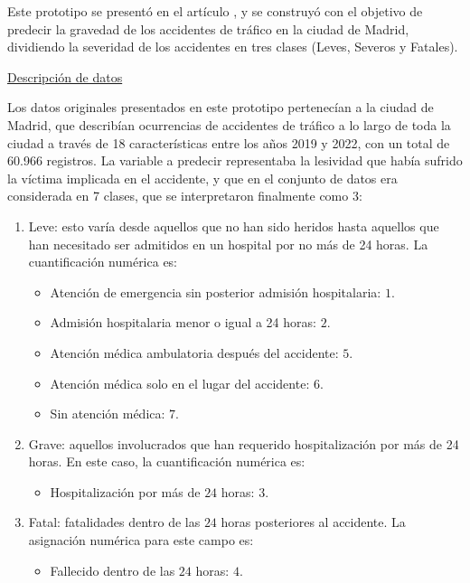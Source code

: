 \documentclass{uathesis-es}
\begin{document}
Este prototipo se presentó en el artículo \cite{PEREZSALA2023113245}, y se construyó con el objetivo de predecir la gravedad de los accidentes de tráfico en la ciudad de Madrid, dividiendo la severidad de los accidentes en tres clases (Leves, Severos y Fatales). 


\underline{Descripción de datos}

Los datos originales presentados en este prototipo pertenecían a la ciudad de Madrid, que describían ocurrencias de accidentes de tráfico a lo largo de toda la ciudad a través de 18 características entre los años 2019 y 2022, con un total de 60.966 registros. La variable a predecir representaba la lesividad que había sufrido la víctima implicada en el accidente, y que en el conjunto de datos era considerada en 7 clases, que se interpretaron finalmente como 3:


\begin{enumerate}
	\item Leve: esto varía desde aquellos que no han sido heridos hasta aquellos que han necesitado ser admitidos en un hospital por no más de 24 horas. La cuantificación numérica es:
	\begin{itemize}
		\item Atención de emergencia sin posterior admisión hospitalaria: $1$.
		\item Admisión hospitalaria menor o igual a 24 horas: $2$.
		\item Atención médica ambulatoria después del accidente: $5$.
		\item Atención médica solo en el lugar del accidente: $6$.
		\item Sin atención médica: $7$.
	\end{itemize}
	\item Grave: aquellos involucrados que han requerido hospitalización por más de 24 horas. En este caso, la cuantificación numérica es:
	\begin{itemize}
		\item Hospitalización por más de $24$ horas: $3$.
	\end{itemize}
	\item Fatal: fatalidades dentro de las $24$ horas posteriores al accidente. La asignación numérica para este campo es:
	\begin{itemize}
		\item Fallecido dentro de las $24$ horas: $4$.
	\end{itemize}
\end{enumerate}
\end{document}
